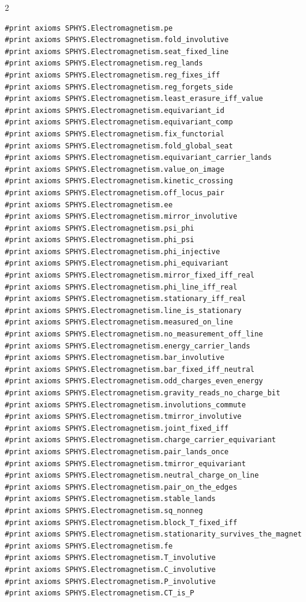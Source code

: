 \documentclass[10pt]{article}
\begin{document}
\begin{multicols}{2}
\begin{Verbatim}[fontsize=\fontsize{6.0}{6.9}\selectfont,breaklines,breakanywhere,breaksymbolleft={}]
#print axioms SPHYS.Electromagnetism.pe
#print axioms SPHYS.Electromagnetism.fold_involutive
#print axioms SPHYS.Electromagnetism.seat_fixed_line
#print axioms SPHYS.Electromagnetism.reg_lands
#print axioms SPHYS.Electromagnetism.reg_fixes_iff
#print axioms SPHYS.Electromagnetism.reg_forgets_side
#print axioms SPHYS.Electromagnetism.least_erasure_iff_value
#print axioms SPHYS.Electromagnetism.equivariant_id
#print axioms SPHYS.Electromagnetism.equivariant_comp
#print axioms SPHYS.Electromagnetism.fix_functorial
#print axioms SPHYS.Electromagnetism.fold_global_seat
#print axioms SPHYS.Electromagnetism.equivariant_carrier_lands
#print axioms SPHYS.Electromagnetism.value_on_image
#print axioms SPHYS.Electromagnetism.kinetic_crossing
#print axioms SPHYS.Electromagnetism.off_locus_pair
#print axioms SPHYS.Electromagnetism.ee
#print axioms SPHYS.Electromagnetism.mirror_involutive
#print axioms SPHYS.Electromagnetism.psi_phi
#print axioms SPHYS.Electromagnetism.phi_psi
#print axioms SPHYS.Electromagnetism.phi_injective
#print axioms SPHYS.Electromagnetism.phi_equivariant
#print axioms SPHYS.Electromagnetism.mirror_fixed_iff_real
#print axioms SPHYS.Electromagnetism.phi_line_iff_real
#print axioms SPHYS.Electromagnetism.stationary_iff_real
#print axioms SPHYS.Electromagnetism.line_is_stationary
#print axioms SPHYS.Electromagnetism.measured_on_line
#print axioms SPHYS.Electromagnetism.no_measurement_off_line
#print axioms SPHYS.Electromagnetism.energy_carrier_lands
#print axioms SPHYS.Electromagnetism.bar_involutive
#print axioms SPHYS.Electromagnetism.bar_fixed_iff_neutral
#print axioms SPHYS.Electromagnetism.odd_charges_even_energy
#print axioms SPHYS.Electromagnetism.gravity_reads_no_charge_bit
#print axioms SPHYS.Electromagnetism.involutions_commute
#print axioms SPHYS.Electromagnetism.tmirror_involutive
#print axioms SPHYS.Electromagnetism.joint_fixed_iff
#print axioms SPHYS.Electromagnetism.charge_carrier_equivariant
#print axioms SPHYS.Electromagnetism.pair_lands_once
#print axioms SPHYS.Electromagnetism.tmirror_equivariant
#print axioms SPHYS.Electromagnetism.neutral_charge_on_line
#print axioms SPHYS.Electromagnetism.pair_on_the_edges
#print axioms SPHYS.Electromagnetism.stable_lands
#print axioms SPHYS.Electromagnetism.sq_nonneg
#print axioms SPHYS.Electromagnetism.block_T_fixed_iff
#print axioms SPHYS.Electromagnetism.stationarity_survives_the_magnet
#print axioms SPHYS.Electromagnetism.fe
#print axioms SPHYS.Electromagnetism.T_involutive
#print axioms SPHYS.Electromagnetism.C_involutive
#print axioms SPHYS.Electromagnetism.P_involutive
#print axioms SPHYS.Electromagnetism.CT_is_P

\end{Verbatim}
\end{multicols}
\end{document}
